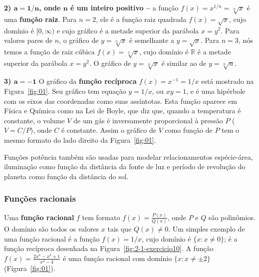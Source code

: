 \noindent \textbf{2) $\boldsymbol{a=1/n}$, onde $\boldsymbol{n}$ é um inteiro positivo -- } a função $f(x)=x^{1/n}=\sqrt[n]{x}$ é uma \textbf{função raiz}. Para $n=2$, ele é a função raiz quadrada $f(x)=\sqrt{x}$, cujo domínio é $[0,\infty)$ e cujo gráfico é a metade superior da parábola $x=y^2$. Para valores pares de $n$, o gráfico de $y=\sqrt[n]{x}$ é semelhante a $y=\sqrt{x}$. Para $n=3$, nós temos a função de raiz cúbica $f(x)=\sqrt[3]{x}$, cujo domínio é $\mathds{R}$ é a metade superior da parábola $x=y^2$. O gráfico de $y=\sqrt[n]{x}$ é similar ao de $y=\sqrt[3]{n}$.
\vspace{-0.5cm}\begin{figure}[!ht]
	\centering
	\caption{}\label{fig:root-functions}\vspace{-0.2cm}
\end{figure}

\noindent \textbf{3) $\boldsymbol{a=-1}$}
O gráfico da \textbf{função recíproca} $f(x) = x^{-1} = 1/x$ está mostrado na Figura~\ref{fig:01}. Seu gráfico tem equação $y=1/x$, ou $xy=1$, e é uma hipérbole com os eixos das coordenadas como suas assíntotas. Esta função aparece em Física e Química como na Lei de Boyle, que diz que, quando a temperatura é constante, o volume $V$ de um gás é inversamente proporcional à pressão $P$ ($V=C/P$), onde $C$ é constante. Assim o gráfico de $V$ como função de $P$ tem o mesmo formato do lado direito da Figura~\ref{fig:01}. 

Funções potência também são usadas para modelar relacionamentos espécie-área, iluminação como função da distância da fonte de luz e período de revolução do planeta como função da distância do sol.

\vspace{-0.2cm}
\subsubsection{Funções racionais}

Uma \textbf{função racional} $f$ tem formato $\displaystyle f(x)=\frac{P(x)}{Q(x)}$, onde $P$ e $Q$ são polinômios. O domínio são todos os valores $x$ tais que $Q(x)\neq 0$. Um simples exemplo de uma função racional é a função $f(x)=1/x$, cujo domínio é $\{x:x\neq 0\}$; é a função recíproca desenhada na Figura~\ref{fig:2-1-exercicio10}. A função $\displaystyle f(x)=\frac{2x^4-x^2+1}{x^2-4}$ é uma função racional com domínio $\{x:x\neq \pm 2\}$ (Figura~\ref{fig:01}).

